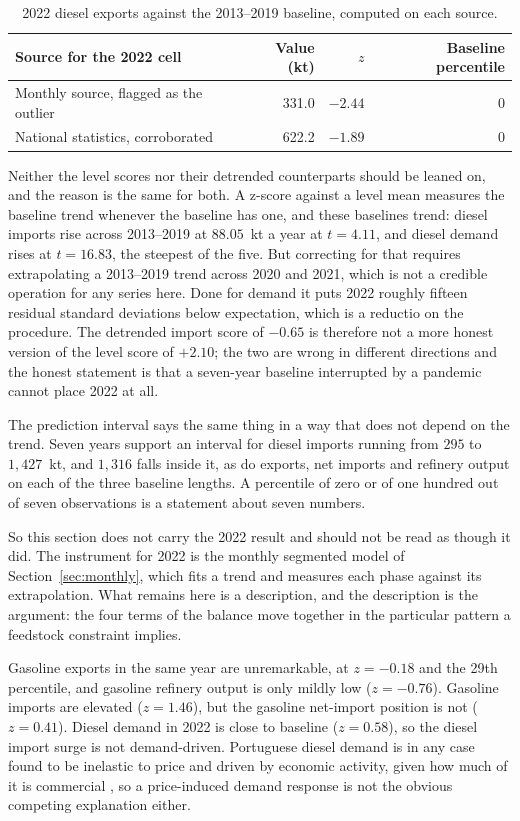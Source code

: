 \documentclass[11pt,a4paper]{article}
\begin{document}
\begin{table}[htbp]
\centering
\caption{2022 diesel exports against the 2013--2019 baseline, computed on each source.}
\label{tab:stresssens}
\begin{tabular}{lrrr}
\toprule
Source for the 2022 cell & Value (kt) & $z$ & Baseline percentile \\
\midrule
Monthly source, flagged as the outlier & 331.0 & $-2.44$ & 0 \\
National statistics, corroborated & 622.2 & $-1.89$ & 0 \\
\bottomrule
\end{tabular}
\end{table}

Neither the level scores nor their detrended counterparts should be leaned on, and the reason is
the same for both. A z-score against a level mean measures the baseline trend whenever the
baseline has one, and these baselines trend: diesel imports rise across 2013--2019 at $88.05$~kt
a year at $t=4.11$, and diesel demand rises at $t=16.83$, the steepest of the five. But
correcting for that requires extrapolating a 2013--2019 trend across 2020 and 2021, which is not
a credible operation for any series here. Done for demand it puts 2022 roughly fifteen residual
standard deviations below expectation, which is a reductio on the procedure. The detrended
import score of $-0.65$ is therefore not a more honest version of the level score of $+2.10$;
the two are wrong in different directions and the honest statement is that a seven-year baseline
interrupted by a pandemic cannot place 2022 at all.

The prediction interval says the same thing in a way that does not depend on the trend. Seven
years support an interval for diesel imports running from $295$ to $1{,}427$~kt, and $1{,}316$
falls inside it, as do exports, net imports and refinery output on each of the three baseline
lengths. A percentile of zero or of one hundred out of seven observations is a statement about
seven numbers.

So this section does not carry the 2022 result and should not be read as though it did. The
instrument for 2022 is the monthly segmented model of Section~\ref{sec:monthly}, which fits a
trend and measures each phase against its extrapolation. What remains here is a description, and
the description is the argument: the four terms of the balance move together in the particular
pattern a feedstock constraint implies.

Gasoline exports in the same year are unremarkable, at $z=-0.18$ and the 29th percentile, and
gasoline refinery output is only mildly low ($z=-0.76$). Gasoline imports are elevated
($z=1.46$), but the gasoline net-import position is not ($z=0.41$). Diesel demand in 2022 is
close to baseline ($z=0.58$), so the diesel import surge is not demand-driven. Portuguese diesel demand is in any case
found to be inelastic to price and driven by economic activity, given how much of it is
commercial \citep{silva2022different, silva2021dynamic}, so a price-induced demand response is
not the obvious competing explanation either.
\end{document}
